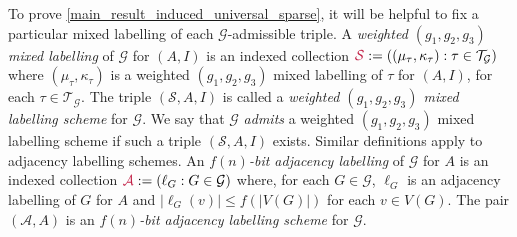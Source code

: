 \documentclass{patmorin}
\makeatletter
\renewcommand{\le}{\leqslant}
\newcommand{\defin}[1]{\emph{\textcolor{brightmaroon}{#1}}}
\def\mathcolor#1#{\@mathcolor{#1}}
\def\@mathcolor#1#2#3{%
  \protect\leavevmode
  \begingroup
    \color#1{#2}#3%
  \endgroup
}
\newcommand{\mathdefin}[1]{\mathcolor{brightmaroon}{#1}}
\newcommand{\calA}{\mathcal{A}}
\newcommand{\calG}{\mathcal{G}}
\newcommand{\calS}{\mathcal{S}}
\newcommand{\calT}{\mathcal{T}}
\makeatother
\begin{document}
To prove \cref{main_result_induced_universal_sparse}, it will be helpful to fix a particular mixed labelling of each $\calG$-admissible triple.  
A \defin{weighted $(g_1,g_2,g_3)$ mixed labelling} of $\calG$ for $(A,I)$ is an indexed collection $\mathdefin{\calS}:=((\mu_\tau,\kappa_\tau):\tau\in\calT_\calG)$ where $(\mu_\tau,\kappa_\tau)$ is a weighted $(g_1,g_2,g_3)$ mixed labelling of $\tau$ for $(A,I)$, for each $\tau\in\calT_\calG$.  The triple $(\calS,A,I)$ is called a \defin{weighted $(g_1,g_2,g_3)$ mixed labelling scheme} for $\calG$. We say that $\calG$ \defin{admits} a weighted $(g_1,g_2,g_3)$ mixed labelling scheme if such a triple $(\calS,A,I)$ exists.  Similar definitions apply to adjacency labelling schemes. An \defin{$f(n)$-bit adjacency labelling} of $\calG$ for $A$ is an indexed collection $\mathdefin{\calA}:=(\ell_G:G\in\calG)$ where, for each $G\in\calG$,  $\ell_G$ is an adjacency labelling of $G$ for $A$ and $|\ell_G(v)|\le f(|V(G)|)$ for each $v\in V(G)$.  The pair $(\calA,A)$ is an \defin{$f(n)$-bit adjacency labelling scheme} for $\calG$.







\end{document}
